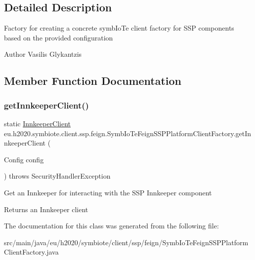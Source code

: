 \subsection{Detailed Description}
Factory for creating a concrete symb\+Io\+Te client factory for S\+SP components based on the provided configuration

\begin{DoxyAuthor}{Author}
Vasilis Glykantzis 
\end{DoxyAuthor}


\subsection{Member Function Documentation}
\mbox{\label{classeu_1_1h2020_1_1symbiote_1_1client_1_1ssp_1_1feign_1_1SymbIoTeFeignSSPPlatformClientFactory_acc2dac1fb5b7cc98e0228d6c8ae8d68e}} 
\subsubsection{\texorpdfstring{get\+Innkeeper\+Client()}{getInnkeeperClient()}}
{\footnotesize\ttfamily static \hyperlink{interfaceeu_1_1h2020_1_1symbiote_1_1client_1_1ssp_1_1interfaces_1_1InnkeeperClient}{Innkeeper\+Client} eu.\+h2020.\+symbiote.\+client.\+ssp.\+feign.\+Symb\+Io\+Te\+Feign\+S\+S\+P\+Platform\+Client\+Factory.\+get\+Innkeeper\+Client (\begin{DoxyParamCaption}\item[{Config}]{config }\end{DoxyParamCaption}) throws Security\+Handler\+Exception\hspace{0.3cm}{\ttfamily [static]}}

Get an Innkeeper for interacting with the S\+SP Innkeeper component

\begin{DoxyReturn}{Returns}
an Innkeeper client 
\end{DoxyReturn}


The documentation for this class was generated from the following file\+:\begin{DoxyCompactItemize}
\item 
src/main/java/eu/h2020/symbiote/client/ssp/feign/Symb\+Io\+Te\+Feign\+S\+S\+P\+Platform\+Client\+Factory.\+java\end{DoxyCompactItemize}

